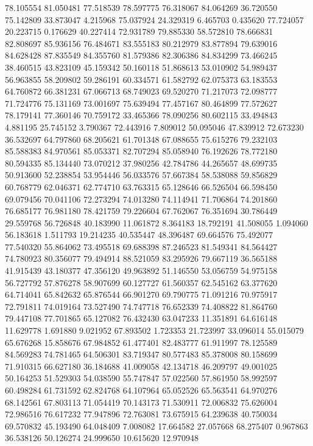 78.105554
81.050481
77.518539
78.597775
76.318067
84.064269
36.720550
75.142809
33.873047
4.215968
75.037924
24.329319
6.465703
0.435620
77.724057
20.223715
0.176629
40.227414
72.931789
79.885330
58.572810
78.666831
82.808697
85.936156
76.484671
83.555183
80.212979
83.877894
79.639016
84.628428
87.835549
84.355760
81.579386
82.306386
84.834299
73.466245
38.460515
43.823109
45.159342
50.160118
51.868613
53.010902
54.989437
56.963855
58.209802
59.286191
60.334571
61.582792
62.075373
63.183553
64.760872
66.381231
67.066713
68.749023
69.520270
71.217073
72.098777
71.724776
75.131169
73.001697
75.639494
77.457167
80.464899
77.572627
78.179141
77.360146
70.759172
33.465366
78.090256
80.602115
33.494843
4.881195
25.745152
3.790367
72.443916
7.809012
50.095046
47.839912
72.673230
36.532697
64.797860
68.205621
61.701348
67.088655
75.615276
79.232103
85.588383
84.970561
85.053371
82.707294
85.058940
76.192626
78.772180
80.594335
85.134440
73.070212
37.980256
42.784786
44.265657
48.699735
50.913600
52.238854
53.954446
56.033576
57.667384
58.538088
59.856829
60.768779
62.046371
62.774710
63.763315
65.128646
66.526504
66.598450
69.079456
70.041106
72.273294
74.013280
74.114941
71.706864
74.201860
76.685177
76.981180
78.421759
79.226604
67.762067
76.351694
30.786449
29.559768
56.726848
40.183990
11.061872
8.364183
18.792191
41.508055
1.094060
56.183618
1.511793
19.214235
40.535447
48.396487
69.664576
75.492077
77.540320
55.864062
73.495518
69.688398
87.246523
81.549341
84.564427
74.780923
80.356077
79.494914
88.521059
83.295926
79.667119
36.565188
41.915439
43.180377
47.356120
49.963892
51.146550
53.056759
54.975158
56.727792
57.876278
58.907699
60.127727
61.560357
62.545162
63.377620
64.714041
65.842632
65.876544
66.901270
69.790775
71.091216
70.975917
72.791811
74.019164
73.527490
74.747718
76.652339
74.408822
81.864760
79.447108
77.701865
65.127082
76.432430
63.047233
11.351891
64.616148
11.629778
1.691880
9.021952
67.893502
1.723353
21.723997
33.096014
55.015079
65.676268
15.858676
67.984852
61.477401
82.483777
61.911997
78.125589
84.569283
74.781465
64.506301
83.719347
80.577483
85.378008
80.158699
71.910315
66.627180
36.184688
41.009058
42.134718
46.209797
49.001025
50.164253
51.529303
54.038590
55.747847
57.022560
57.861950
58.992597
60.498284
61.731592
62.824768
64.107964
65.052526
65.563541
64.970276
68.142561
67.803113
71.054419
70.143173
71.530911
72.006832
75.626004
72.986516
76.617232
77.947896
72.763081
73.675915
64.239638
40.750034
69.570832
45.193490
64.048409
7.008082
17.664582
27.057668
68.275407
0.967863
36.538126
50.126274
24.999650
10.615620
12.970948
